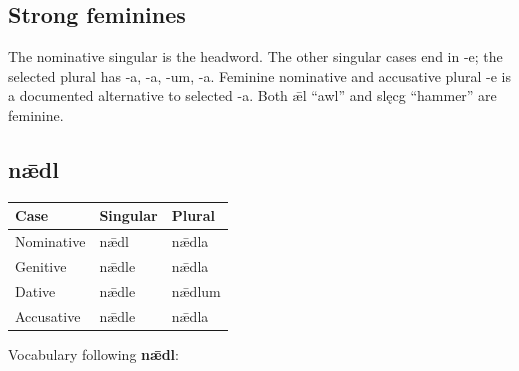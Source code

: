 \subsection*{Strong feminines}

The nominative singular is the headword. The other singular cases end in -e; the selected plural has -a, -a, -um, -a. Feminine nominative and accusative plural -e is a documented alternative to selected -a. Both ǣl “awl” and slęcg “hammer” are feminine.

\subsection*{nǣdl}

\par\begingroup
\fontsize{10.5}{13.2}\selectfont
\setlength{\LTleft}{0pt}\setlength{\LTright}{\fill}
\noindent
\begin{tabular}{@{}>{\raggedright\arraybackslash}p{39.46mm}>{\raggedright\arraybackslash}p{39.46mm}>{\raggedright\arraybackslash}p{39.46mm}@{}}
\toprule
\textbf{Case} & \textbf{Singular} & \textbf{Plural} \\
\midrule
Nominative & nǣdl & nǣdla \\
Genitive & nǣdle & nǣdla \\
Dative & nǣdle & nǣdlum \\
Accusative & nǣdle & nǣdla \\
\bottomrule
\end{tabular}
\par\endgroup

Vocabulary following \textbf{nǣdl}:

